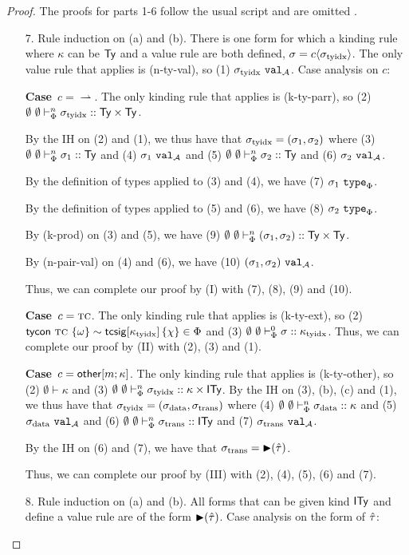 \documentclass[12pt]{article}
\newcommand{\pfcase}[1]{\textbf{Case}~#1. }
\begin{document}
\begin{proof}
The proofs for parts 1-6 follow the usual script and are omitted \cite{pfpl}.

\begin{enumerate}
\item[7.] Rule induction on (a) and (b). There is one form for which a kinding rule where $\kappa$ can be ${\sf Ty}$ and a value rule are both defined, $\sigma={c}\langle\sigma_\text{tyidx}\rangle$. The only value rule that applies is (n-ty-val), so (1) $\sigma_\text{tyidx}~\mathtt{val}_{\mathcal{A}}$.  Case analysis on $c$:

\pfcase{$c=\rightharpoonup$} The only kinding rule that applies is (k-ty-parr), so  (2) $\emptyset~\emptyset \vdash_{\Phi}^{n} \sigma_\text{tyidx} :: {\sf Ty}\times{\sf Ty}$. 

By the IH on (2) and (1), we thus have that $\sigma_\text{tyidx}=(\sigma_1, \sigma_2)$ where (3) $\emptyset~\emptyset \vdash_{\Phi}^{n} \sigma_1 :: {\sf Ty}$ and (4) $\sigma_1~\mathtt{val}_{\mathcal{A}}$ and (5) $\emptyset~\emptyset \vdash_{\Phi}^{n} \sigma_2 :: {\sf Ty}$ and (6) $\sigma_2~\mathtt{val}_{\mathcal{A}}$.

By the definition of types applied to (3) and (4), we have (7) $\sigma_1~\mathtt{type}_{\Phi}$. 

By the definition of types applied to (5) and (6), we have (8) $\sigma_2~\mathtt{type}_{\Phi}$. 

By (k-prod) on (3) and (5), we have (9) $\emptyset~\emptyset \vdash_{\Phi}^{n} (\sigma_1, \sigma_2) :: {\sf Ty}\times{\sf Ty}$.

By (n-pair-val) on (4) and (6), we have (10) $(\sigma_1, \sigma_2)~\mathtt{val}_{\mathcal{A}}$. 

Thus, we can complete our proof by (I) with (7), (8), (9) and (10).

\pfcase{$c=\textsc{tc}$} The only kinding rule that applies is (k-ty-ext), so (2) ${\sf tycon}~\textsc{tc} ~\{\omega\} \sim {\sf tcsig}[\kappa_\text{tyidx}]\,\{\chi\} \in \Phi$ and (3) $\emptyset~\emptyset \vdash_{\Phi}^{0} \sigma :: \kappa_\text{tyidx}$. Thus, we can complete our proof by (II) with (2), (3) and (1).

\pfcase{$c={\sf other}[m;\kappa]$} The only kinding rule that applies is (k-ty-other), so  (2) $\emptyset \vdash \kappa$ and (3) $\emptyset~\emptyset \vdash_{\Phi}^{n} \sigma_\text{tyidx} :: \kappa\times{\sf ITy}$. By the IH on (3), (b), (c) and (1), we thus have that $\sigma_\text{tyidx}=(\sigma_\text{data}, \sigma_\text{trans})$ where (4) $\emptyset~\emptyset \vdash_{\Phi}^{n} \sigma_\text{data} :: \kappa$ and (5) $\sigma_\text{data}~\mathtt{val}_{\mathcal{A}}$ and (6) $\emptyset~\emptyset \vdash_{\Phi}^{n} \sigma_\text{trans} :: {\sf ITy}$ and (7) $\sigma_\text{trans}~\mathtt{val}_{\mathcal{A}}$.

By the IH on (6) and (7), we have that $\sigma_\text{trans}={\blacktriangleright}(\hat{\tau})$.

Thus, we can complete our proof by (III) with (2), (4), (5), (6) and (7).

\item[8.] Rule induction on (a) and (b). All forms that can be given kind ${\sf ITy}$ and define a value rule are of the form ${\blacktriangleright}(\hat{\tau})$. Case analysis on the form of $\hat{\tau}$:


\end{enumerate}
\end{proof}
\end{document}
